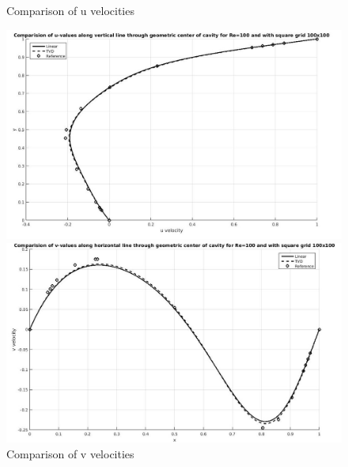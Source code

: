 \documentclass[12pt]{elsarticle}
\begin{document}
	\begin{figure}[h]
		\caption{Comparison of u velocities}
		\centering\includegraphics[width=1.0\linewidth]{11_uvalues_tvd_linear_re_100_100_100}
		\caption{Comparison of v velocities}
		\centering\includegraphics[width=1.0\linewidth]{12_vvalues_tvd_linear_re_100_100_100}
	\end{figure}
	
\end{document}
